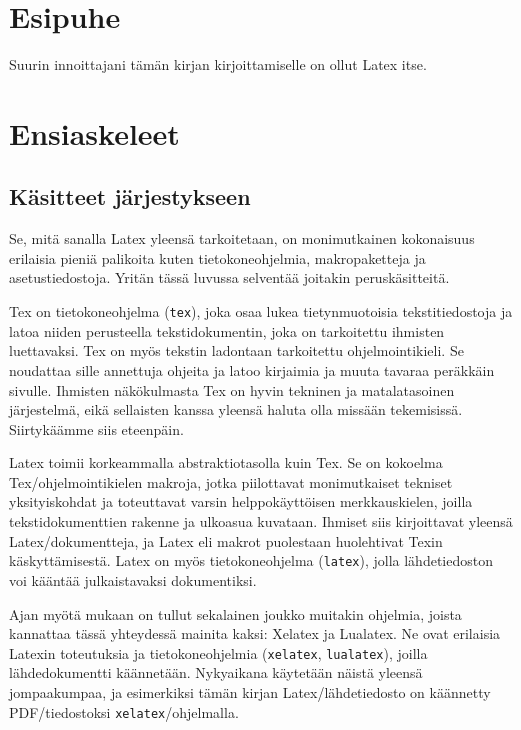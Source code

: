 \documentclass[a4paper,10pt,notitlepage,oneside]{book}
\newcommand{\koodi}[1]{\texttt{#1}}
\begin{document}
\pagestyle{fancy}


\chapter*{Esipuhe}

Suurin innoittajani tämän kirjan kirjoittamiselle on ollut Latex itse.

\chapter{Ensiaskeleet}
\section{Käsitteet järjestykseen}

Se, mitä sanalla Latex yleensä tarkoitetaan, on monimutkainen
kokonaisuus erilaisia pieniä palikoita kuten tietokone\-ohjelmia,
makropaketteja ja asetustiedostoja. Yritän tässä luvussa selventää
joitakin peruskäsitteitä.

Tex on tietokoneohjelma (\koodi{tex}), joka osaa lukea tietynmuotoisia
tekstitiedostoja ja latoa niiden perusteella tekstidokumentin, joka on
tarkoitettu ihmisten luettavaksi. Tex on myös tekstin ladontaan
tarkoitettu ohjelmointikieli. Se noudattaa sille annettuja ohjeita ja
latoo kirjaimia ja muuta tavaraa peräkkäin sivulle. Ihmisten
näkökulmasta Tex on hyvin tekninen ja matalatasoinen järjestelmä, eikä
sellaisten kanssa yleensä haluta olla missään tekemisissä. Siirtykäämme
siis eteenpäin.

Latex toimii korkeammalla abstraktiotasolla kuin Tex. Se on kokoelma
Tex\-/ohjelmointikielen makroja, jotka piilottavat monimutkaiset
tekniset yksityiskohdat ja toteuttavat varsin helppokäyttöisen
merkkauskielen, joilla tekstidokumenttien rakenne ja ulko\-asua
kuvataan. Ihmiset siis kirjoittavat yleensä Latex\-/dokumentteja, ja
Latex eli makrot puolestaan huolehtivat Texin käskyttämisestä. Latex on
myös tietokone\-ohjelma (\koodi{latex}), jolla lähdetiedoston voi
kääntää julkaistavaksi dokumentiksi.

Ajan myötä mukaan on tullut sekalainen joukko muitakin ohjelmia, joista
kannattaa tässä yhteydessä mainita kaksi: Xelatex ja Lualatex. Ne ovat
erilaisia Latexin toteutuksia ja tietokone\-ohjelmia (\koodi{xelatex},
\koodi{lualatex}), joilla lähdedokumentti käännetään. Nyky\-aikana
käytetään näistä yleensä jompaakumpaa, ja esimerkiksi tämän kirjan
Latex\-/lähdetiedosto on käännetty PDF\-/tiedostoksi
\koodi{xelatex}\-/ohjelmalla.
\end{document}
